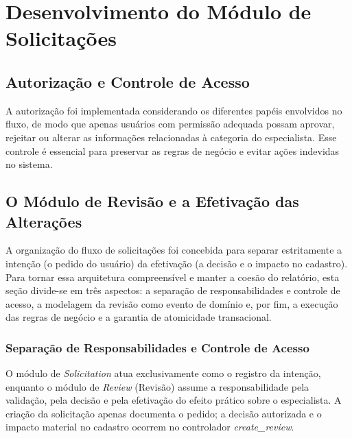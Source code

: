 \section{Desenvolvimento do Módulo de Solicitações}
\label{sec:modulo-solicitacoes}





\subsection{Autorização e Controle de Acesso}
\label{subsec:autorizacao-controle-acesso}

A autorização foi implementada considerando os diferentes papéis envolvidos no fluxo, de
modo que apenas usuários com permissão adequada possam aprovar, rejeitar ou alterar as
informações relacionadas à categoria do especialista. Esse controle é essencial para
preservar as regras de negócio e evitar ações indevidas no sistema.

\subsection{O Módulo de Revisão e a Efetivação das Alterações}

A organização do fluxo de solicitações foi concebida para separar estritamente a
intenção (o pedido do usuário) da efetivação (a decisão e o impacto no cadastro). Para
tornar essa arquitetura compreensível e manter a coesão do relatório, esta seção
divide-se em três aspectos: a separação de responsabilidades e controle de acesso, a
modelagem da revisão como evento de domínio e, por fim, a execução das regras de negócio
e a garantia de atomicidade transacional.

\subsubsection{Separação de Responsabilidades e Controle de Acesso}

O módulo de \textit{Solicitation} atua exclusivamente como o registro da intenção,
enquanto o módulo de \textit{Review} (Revisão) assume a responsabilidade pela validação,
pela decisão e pela efetivação do efeito prático sobre o especialista. A criação da
solicitação apenas documenta o pedido; a decisão autorizada e o impacto material no
cadastro ocorrem no controlador \textit{create\_review}.

